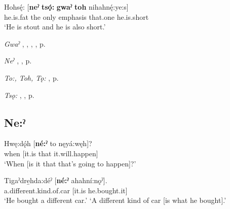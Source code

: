 \ea
\label{ex:npar35}
\gll Hohsę́: [\textbf{neˀ} \textbf{tsǫ́:} \textbf{gwaˀ} \textbf{toh} nihahnę́:ye:s]\\
he.is.fat the only emphasis that.one he.is.short\\
\glt ‘He is stout and he is also short.’
\z

\begin{CayugaRelated}
\item \textit{Gwaˀ} , , , , p. \pageref{p:[gwaˀ] ‘immediately’}\\
\item \textit{Neˀ} , , p. \pageref{p:[neˀ]}\\
\item \textit{To:, Toh, Tǫ:} , p. \pageref{p:[to:] ‘that one’}\\
\item \textit{Tsǫ:} , , p. \pageref{p:[tsǫ:]}
\end{CayugaRelated}

\subsection*{\textbf{Ne:ˀ} } \label{p:[ne:ˀ] `it is’}

\ea
\label{ex:npar36}
\gll Hwę:dǫ́h [\textbf{né:ˀ} to nęyá:węh]?\\
when [it.is that it.will.happen]\\
\glt ‘When [is it that that’s going to happen]?’
\z

\ea
\label{ex:npar37}
\gll Tigaˀdre̱hda:déˀ [\textbf{né:ˀ} ahahní:nǫˀ].\\
a.different.kind.of.car [it.is he.bought.it]\\
\glt ‘He bought a different car.’ `A different kind of car [is what he bought].’
\z

